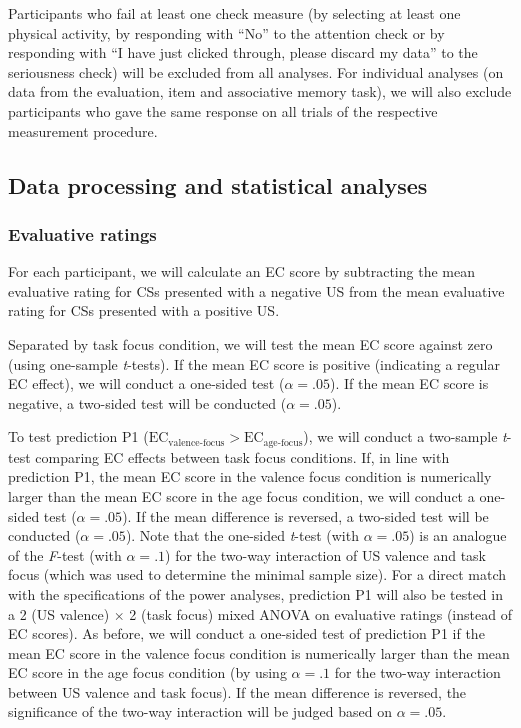 \documentclass[
  doc,floatsintext]{apa6}
\begin{document}
Participants who fail at least one check measure (by selecting at least one physical activity, by responding with ``No'' to the attention check or by responding with ``I have just clicked through, please discard my data'' to the seriousness check) will be excluded from all analyses.
For individual analyses (on data from the evaluation, item and associative memory task), we will also exclude participants who gave the same response on all trials of the respective measurement procedure.

\hypertarget{data-processing-and-statistical-analyses}{%
\subsection{Data processing and statistical analyses}\label{data-processing-and-statistical-analyses}}

\hypertarget{evaluative-ratings}{%
\subsubsection{Evaluative ratings}\label{evaluative-ratings}}

For each participant, we will calculate an EC score by subtracting the mean evaluative rating for CSs presented with a negative US from the mean evaluative rating for CSs presented with a positive US.

Separated by task focus condition, we will test the mean EC score against zero (using one-sample \emph{t}-tests).
If the mean EC score is positive (indicating a regular EC effect), we will conduct a one-sided test (\(\alpha=.05\)).
If the mean EC score is negative, a two-sided test will be conducted (\(\alpha=.05\)).

To test prediction P1 (\(\textrm{EC}_\textrm{valence-focus}>\textrm{EC}_\textrm{age-focus}\)), we will conduct a two-sample \emph{t}-test comparing EC effects between task focus conditions.
If, in line with prediction P1, the mean EC score in the valence focus condition is numerically larger than the mean EC score in the age focus condition, we will conduct a one-sided test (\(\alpha=.05\)).
If the mean difference is reversed, a two-sided test will be conducted (\(\alpha=.05\)).
Note that the one-sided \emph{t}-test (with \(\alpha=.05\)) is an analogue of the \emph{F}-test (with \(\alpha=.1\)) for the two-way interaction of US valence and task focus (which was used to determine the minimal sample size).
For a direct match with the specifications of the power analyses, prediction P1 will also be tested in a 2 (US valence) \(\times\) 2 (task focus) mixed ANOVA on evaluative ratings (instead of EC scores).
As before, we will conduct a one-sided test of prediction P1 if the mean EC score in the valence focus condition is numerically larger than the mean EC score in the age focus condition (by using \(\alpha=.1\) for the two-way interaction between US valence and task focus).
If the mean difference is reversed, the significance of the two-way interaction will be judged based on \(\alpha=.05\).
\end{document}
